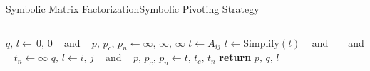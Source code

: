 \begin{frame}{Symbolic Matrix Factorization}{Symbolic Pivoting Strategy}
\begin{columns}
\begin{column}[c]{0.6\textwidth}
\begin{algorithmic}
            \EndFor
          \EndFor
          \State {} %
          \State $q, \, l \gets \, 0, \, 0$  ~ and ~ %
          $p, \, p_c, \, p_n \gets \infty, \, \infty, \, \infty$ %
            \State $t \gets A_{ij}$ %
            \State $t \gets \text{Simplify}(t)$ ~ and ~ %
             ~ and ~ %
            $t_n \gets \infty$ %
              \State $q, \, l \gets i, \, j$ ~ and ~ %
              $p, \, p_c, \, p_n \gets t, \, t_c, \, t_n$ %
            \EndIf
          \EndFor
          \State \textbf{return} $p, \, q, \, l$ %
        \EndProcedure
      \end{algorithmic}
    \end{column}
  \end{columns}
\end{frame}

